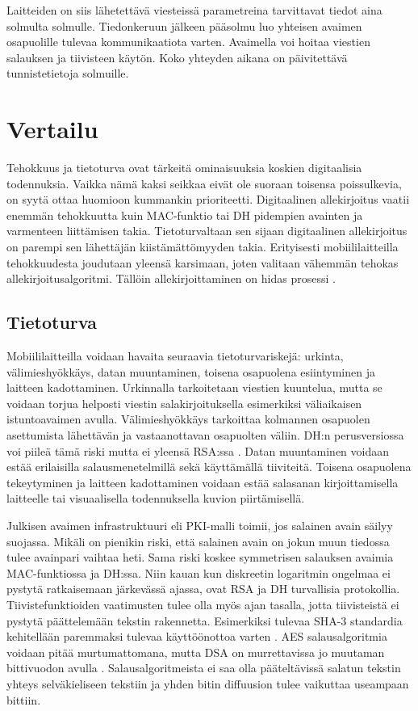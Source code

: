 \documentclass[finnish]{tktltiki2}
\theoremstyle{definition}
\theoremstyle{remark}
\begin{document}
Laitteiden on siis lähetettävä viesteissä parametreina tarvittavat tiedot aina solmulta solmulle. Tiedonkeruun jälkeen pääsolmu luo yhteisen avaimen osapuolille tulevaa kommunikaatiota varten. Avaimella voi hoitaa viestien salauksen ja tiivisteen käytön. Koko yhteyden aikana on päivitettävä tunnistetietoja solmuille.

\section{Vertailu}

Tehokkuus ja tietoturva ovat tärkeitä ominaisuuksia koskien digitaalisia todennuksia. Vaikka nämä kaksi seikkaa eivät ole suoraan toisensa poissulkevia, on syytä ottaa huomioon kummankin prioriteetti. Digitaalinen allekirjoitus vaatii enemmän tehokkuutta kuin MAC-funktio tai DH pidempien avainten ja varmenteen liittämisen takia. Tietoturvaltaan sen sijaan digitaalinen allekirjoitus on parempi sen lähettäjän kiistämättömyyden takia. Erityisesti mobiililaitteilla tehokkuudesta joudutaan yleensä karsimaan, joten valitaan vähemmän tehokas allekirjoitusalgoritmi. Tällöin allekirjoittaminen on hidas prosessi \cite{proxy}.

\subsection{Tietoturva}

Mobiililaitteilla voidaan havaita seuraavia tietoturvariskejä: urkinta, välimieshyökkäys, datan muuntaminen, toisena osapuolena esiintyminen ja laitteen kadottaminen. Urkinnalla tarkoitetaan viestien kuuntelua, mutta se voidaan torjua helposti viestin salakirjoituksella esimerkiksi väliaikaisen istuntoavaimen avulla. Välimieshyökkäys tarkoittaa kolmannen osapuolen asettumista lähettävän ja vastaanottavan osapuolten väliin. DH:n perusversiossa voi piileä tämä riski mutta ei yleensä RSA:ssa \cite{enti}. Datan muuntaminen voidaan estää erilaisilla salausmenetelmillä sekä käyttämällä tiiviteitä. Toisena osapuolena tekeytyminen ja laitteen kadottaminen voidaan estää salasanan kirjoittamisella laitteelle tai visuaalisella todennuksella kuvion piirtämisellä. 

Julkisen avaimen infrastruktuuri eli PKI-malli toimii, jos salainen avain säilyy suojassa. Mikäli on pienikin riski, että salainen avain on jokun muun tiedossa tulee avainpari vaihtaa heti. Sama riski koskee symmetrisen salauksen avaimia MAC-funktiossa ja DH:ssa. Niin kauan kun diskreetin logaritmin ongelmaa ei pystytä ratkaisemaan järkevässä ajassa, ovat RSA ja DH turvallisia protokollia. Tiivistefunktioiden vaatimusten tulee olla myös ajan tasalla, jotta tiivisteistä ei pystytä päättelemään tekstin rakennetta. Esimerkiksi tulevaa SHA-3 standardia kehitellään paremmaksi tulevaa käyttöönottoa varten \cite{nist}. AES salausalgoritmia voidaan pitää murtumattomana, mutta DSA on murrettavissa jo muutaman bittivuodon avulla \cite{gsm}. Salausalgoritmeista ei saa olla pääteltävissä salatun tekstin yhteys selväkieliseen tekstiin ja yhden bitin diffuusion tulee vaikuttaa useampaan bittiin.
\end{document}
